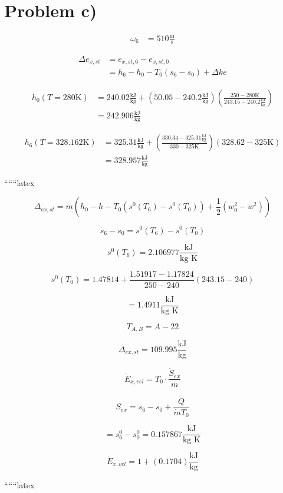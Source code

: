 \section*{Problem c)}

\begin{align*}
    \omega_6 &= 510 \frac{\text{m}}{\text{s}}
\end{align*}


\begin{align*}
    \Delta e_{x,st} &= e_{x,st,6} - e_{x,st,0} \\
    &= h_6 - h_0 - T_0 (s_6 - s_0) + \Delta k e
\end{align*}

\begin{align*}
    h_0 (T = 280 \text{K}) &= 240.02 \frac{\text{kJ}}{\text{kg}} + \left( 50.05 - 240.2 \frac{\text{kJ}}{\text{kg}} \right) \left( \frac{250 - 280 \text{K}}{243.15 - 240.2 \frac{\text{kJ}}{\text{kg}}} \right) \\
    &= 242.906 \frac{\text{kJ}}{\text{kg}}
\end{align*}

\begin{align*}
    h_6 (T = 328.162 \text{K}) &= 325.31 \frac{\text{kJ}}{\text{kg}} + \left( \frac{330.34 - 325.31 \frac{\text{kJ}}{\text{kg}}}{330 - 325 \text{K}} \right) (328.62 - 325 \text{K}) \\
    &= 328.957 \frac{\text{kJ}}{\text{kg}}
\end{align*}

``````latex


\[
\Delta_{ex,st} = \dot{m} \left( h_0 - h - T_0 \left( s^0(T_6) - s^0(T_0) \right) + \frac{1}{2} \left( w_0^2 - w^2 \right) \right)
\]

\[
s_6 - s_0 = s^0(T_6) - s^0(T_0)
\]

\[
s^0(T_6) = 2.106977 \frac{\text{kJ}}{\text{kg K}}
\]

\[
s^0(T_0) = 1.47814 + \frac{1.51917 - 1.17824}{250 - 240} (243.15 - 240)
\]

\[
= 1.4911 \frac{\text{kJ}}{\text{kg K}}
\]

\[
T_{A,B} = A - 22
\]

\[
\Delta_{ex,st} = 109.995 \frac{\text{kJ}}{\text{kg}}
\]

\[
\dot{E}_{x,vel} = T_0 \cdot \frac{\dot{S}_{ex}}{\dot{m}}
\]

\[
\dot{S}_{ex} = s_6 - s_0 + \frac{\dot{Q}}{\dot{m} T_0}
\]

\[
= s^0_6 - s^0_0 = 0.157867 \frac{\text{kJ}}{\text{kg K}}
\]

\[
\dot{E}_{x,vel} = 1 + (0.1704) \frac{\text{kJ}}{\text{kg}}
\]

``````latex